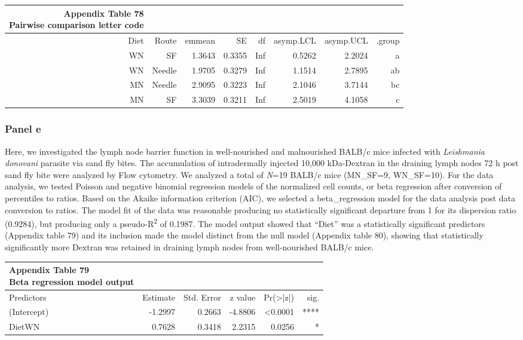 \documentclass[
  12pt,
  letterpaper,
]{article}
\begin{document}
\begingroup
\fontsize{12.0pt}{14.4pt}\selectfont
\begin{longtable}{rrrrrrrr}
\caption*{
{\large \textbf{Appendix Table 78}} \\ 
{\small \textbf{Pairwise comparison letter code}}
} \\ 
\toprule
{Diet} & {Route} & {emmean} & {SE} & {df} & {asymp.LCL} & {asymp.UCL} & {.group} \\ 
\midrule\addlinespace[2.5pt]
WN & SF & 1.3643 & 0.3355 & Inf & 0.5262 & 2.2024 &  a   \\ 
WN & Needle & 1.9705 & 0.3279 & Inf & 1.1514 & 2.7895 &  ab  \\ 
MN & Needle & 2.9095 & 0.3223 & Inf & 2.1046 & 3.7144 &   bc \\ 
MN & SF & 3.3039 & 0.3211 & Inf & 2.5019 & 4.1058 &    c \\ 
\bottomrule
\end{longtable}
\endgroup

\subsubsection{Panel e}\label{panel-e}

Here, we investigated the lymph node barrier function in well-nourished and malnourished BALB/c mice infected with \emph{Leishmania donovani} parasite via sand fly bites. The accumulation of intradermally injected 10,000 kDa-Dextran in the draining lymph nodes 72 h post sand fly bite were analyzed by Flow cytometry. We analyzed a total of \emph{N}=19 BALB/c mice (MN\_SF=9, WN\_SF=10). For the data analysis, we tested Poisson and negative binomial regression models of the normalized cell counts, or beta regression after conversion of percentiles to ratios. Based on the Akaike information criterion (AIC), we selected a beta\_regression model for the data analysis post data conversion to ratios. The model fit of the data was reasonable producing no statistically significant departure from 1 for its dispersion ratio (0.9284), but producing only a pseudo-R\textsuperscript{2} of 0.1987. The model output showed that ``Diet'' was a statistically significant predictors (Appendix table 79) and its inclusion made the model distinct from the null model (Appendix table 80), showing that statistically significantly more Dextran was retained in draining lymph nodes from well-nourished BALB/c mice.

\begingroup
\fontsize{12.0pt}{14.4pt}\selectfont
\begin{longtable}{l|rrrrr}
\caption*{
{\large \textbf{Appendix Table 79}} \\ 
{\small \textbf{Beta regression model output}}
} \\ 
\toprule
Predictors & {Estimate} & {Std. Error} & {z value} & {Pr(>|z|)} & {sig.} \\ 
\midrule\addlinespace[2.5pt]
(Intercept) & -1.2997 & 0.2663 & -4.8806 & <0.0001 & **** \\ 
DietWN & 0.7628 & 0.3418 & 2.2315 & 0.0256 & * \\ 
\bottomrule
\end{longtable}
\endgroup
\end{document}
